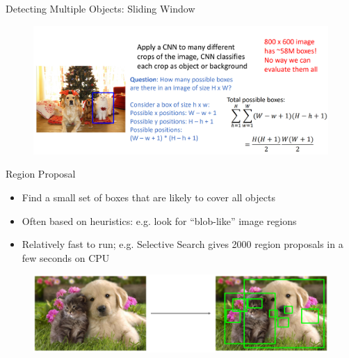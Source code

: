 \documentclass[10pt]{beamer}
\theoremstyle{remark}
\theoremstyle{definition}
\begin{document}
\begin{frame}[allowframebreaks]{Detecting Multiple Objects: Sliding Window}
\framebreak

\begin{figure}
\centering
\includegraphics[width=1.0\textwidth,height=1.0\textheight,keepaspectratio]{./images/object_16.png}
\end{figure}

\end{frame}

\begin{frame}{Region Proposal}
\begin{itemize}
    \item Find a small set of boxes that are likely to cover all objects
    \item Often based on heuristics: e.g. look for “blob-like” image regions
    \item Relatively fast to run; e.g. Selective Search gives 2000 region proposals in a few seconds on CPU

\end{itemize}
\begin{figure}
\centering
\includegraphics[width=1.0\textwidth,height=1.0\textheight,keepaspectratio]{./images/object_17.png}
\end{figure}
    
\end{frame}
\end{document}

